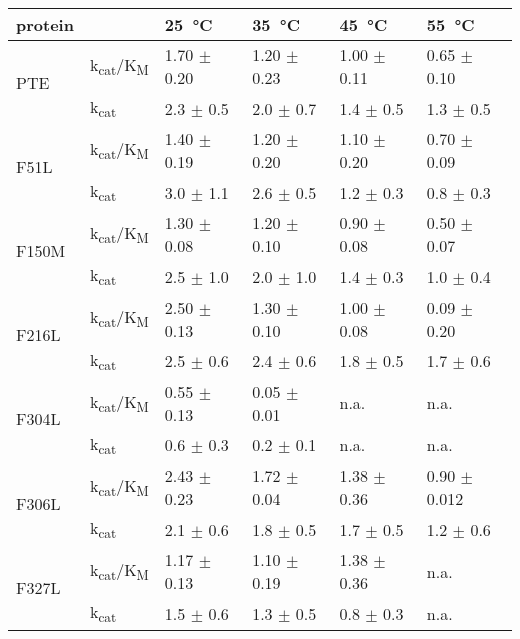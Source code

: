 \begin{refsection}
\begin{table}[h!]
    \centering
    \begin{tabular}{llllll}
    \hline%
    protein &  & \SI{25}{\celsius} & \SI{35}{\celsius} &
    \SI{45}{\celsius} & \SI{55}{\celsius} \\
    \hline

    \multirow{2}{*}{PTE}    & k\textsubscript{cat}/K\textsubscript{M} & 1.70 $
    \pm$ 0.20 & 1.20 $\pm$ 0.23 & 1.00 $\pm$ 0.11 & 0.65 $\pm$ 0.10 \\
    & k\textsubscript{cat} & 2.3 $\pm$ 0.5 & 2.0 $\pm$ 0.7 & 1.4 $\pm$ 0.5 & 1.3
    $\pm$ 0.5 \\
    
    \multirow{2}{*}{F51L}  & k\textsubscript{cat}/K\textsubscript{M} & 1.40
    $\pm$ 0.19 & 1.20 $\pm$ 0.20 & 1.10 $\pm$ 0.20 & 0.70 $\pm$ 0.09 \\
    & k\textsubscript{cat} & 3.0 $\pm$ 1.1 & 2.6 $\pm$ 0.5 & 1.2 $\pm$ 0.3 &
    0.8 $\pm$ 0.3 \\
    
    \multirow{2}{*}{F150M} & k\textsubscript{cat}/K\textsubscript{M} &
    1.30 $\pm$ 0.08 & 1.20 $\pm$ 0.10 & 0.90 $\pm$ 0.08 & 0.50 $\pm$ 0.07 \\
    & k\textsubscript{cat} & 2.5 $\pm$ 1.0 & 2.0 $\pm$ 1.0 & 1.4 $\pm$ 0.3 &
    1.0 $\pm$ 0.4 \\
    
    \multirow{2}{*}{F216L} & k\textsubscript{cat}/K\textsubscript{M}
    & 2.50 $\pm$ 0.13 & 1.30 $\pm$ 0.10 & 1.00 $\pm$ 0.08 & 0.09 $\pm$ 0.20 \\
    & k\textsubscript{cat} & 2.5 $\pm$ 0.6 & 2.4 $\pm$ 0.6 & 1.8 $\pm$ 0.5 &
    1.7 $\pm$ 0.6 \\
    
    \multirow{2}{*}{F304L}  & k\textsubscript{cat}/K\textsubscript{M} & 0.55
    $\pm$ 0.13 & 0.05 $\pm$ 0.01 & n.a. & n.a. \\
    & k\textsubscript{cat} & 0.6 $\pm$ 0.3 & 0.2 $\pm$ 0.1& n.a. & n.a. \\
    
    \multirow{2}{*}{F306L}  & k\textsubscript{cat}/K\textsubscript{M} & 2.43
    $\pm$ 0.23 & 1.72 $\pm$ 0.04 & 1.38 $\pm$ 0.36 & 0.90 $\pm$ 0.012 \\
    & k\textsubscript{cat} & 2.1 $\pm$ 0.6 & 1.8 $\pm$ 0.5 & 1.7 $\pm$ 0.5 &
    1.2 $\pm$ 0.6 \\
    
    \multirow{2}{*}{F327L}  & k\textsubscript{cat}/K\textsubscript{M} & 1.17
    $\pm$ 0.13 & 1.10 $\pm$ 0.19 & 1.38 $\pm$ 0.36 & n.a. \\
    & k\textsubscript{cat} & 1.5 $\pm$ 0.6 & 1.3 $\pm$ 0.5 & 0.8 $\pm$ 0.3 &
    n.a. \\
    

\end{tabular}
\end{table}
\end{refsection}
